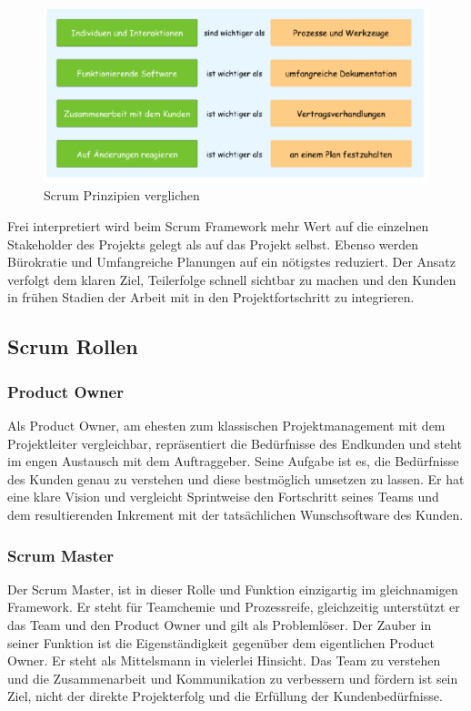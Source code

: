 \begin{figure}[!htb]
  \centering
  \includegraphics[width=1\textwidth]{figures/daniel/Bild-1.png}
  \caption[]{Scrum Prinzipien verglichen}
  \label{fig:scrum_prinzipien}
\end{figure}

Frei interpretiert wird beim Scrum Framework mehr Wert auf die einzelnen Stakeholder des Projekts gelegt als auf das Projekt selbst. Ebenso werden Bürokratie und Umfangreiche Planungen auf ein nötigstes reduziert. Der Ansatz verfolgt dem klaren Ziel, Teilerfolge schnell sichtbar zu machen und den Kunden in frühen Stadien der Arbeit mit in den Projektfortschritt zu integrieren. 

\subsection{Scrum Rollen}
\subsubsection{Product Owner}
Als Product Owner, am ehesten zum klassischen Projektmanagement mit dem Projektleiter vergleichbar, repräsentiert die Bedürfnisse des Endkunden und steht im engen Austausch mit dem Auftraggeber. Seine Aufgabe ist es, die Bedürfnisse des Kunden genau zu verstehen und diese bestmöglich umsetzen zu lassen. Er hat eine klare Vision und vergleicht Sprintweise den Fortschritt seines Teams und dem resultierenden Inkrement mit der tatsächlichen Wunschsoftware des Kunden. 

\subsubsection{Scrum Master}
Der Scrum Master, ist in dieser Rolle und Funktion einzigartig im gleichnamigen Framework. Er steht für Teamchemie und Prozessreife, gleichzeitig unterstützt er das Team und den Product Owner und gilt als Problemlöser. Der Zauber in seiner Funktion ist die Eigenständigkeit gegenüber dem eigentlichen Product Owner. Er steht als Mittelsmann in vielerlei Hinsicht. Das Team zu verstehen und die Zusammenarbeit und Kommunikation zu verbessern und fördern ist sein Ziel, nicht der direkte Projekterfolg und die Erfüllung der Kundenbedürfnisse.

